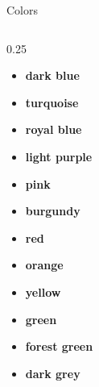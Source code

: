 \begin{frame}[t]{Colors}
\begin{columns}[T, onlytextwidth]
    \begin{column}{0.25\textwidth}
      \begin{itemize}
        \item \textcolor{tud DarkBluePale}{\textbf{dark blue}}
        \item \textcolor{tud TurquoisePale}{\textbf{turquoise}}
        \item \textcolor{tud RoyalBluePale}{\textbf{royal blue}}
        \item \textcolor{tud LightPurplePale}{\textbf{light purple}}
        \item \textcolor{tud PinkPale}{\textbf{pink}}
        \item \textcolor{tud BurgundyPale}{\textbf{burgundy}}
        \item \textcolor{tud RedPale}{\textbf{red}}
        \item \textcolor{tud OrangePale}{\textbf{orange}}
        \item \textcolor{tud YellowPale}{\textbf{yellow}}
        \item \textcolor{tud GreenPale}{\textbf{green}}
        \item \textcolor{tud ForestGreenPale}{\textbf{forest green}}
        \item \textcolor{tud DarkGreyPale}{\textbf{dark grey}}
      \end{itemize}
    \end{column}
  \end{columns}
\end{frame}
